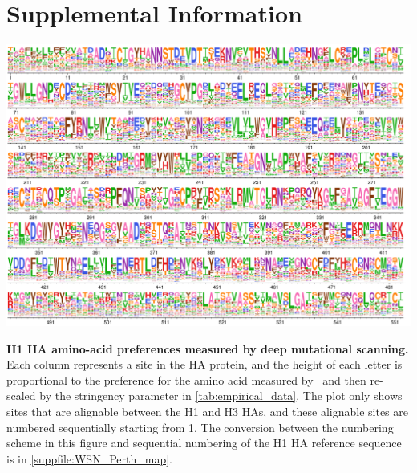\documentclass[11pt]{article}
\begin{document}
\clearpage 

{\small

}

\newpage
\setcounter{page}{1}
\renewcommand{\thepage}{S\arabic{page}}
\section*{Supplemental Information}

\begin{suppfig}[H]
\centerline{\includegraphics[width=\textwidth]{figures/prefs_doud}}
\caption{\label{suppfig:prefs_doud}
\textbf{H1 HA amino-acid preferences measured by deep mutational scanning.}
Each column represents a site in the HA protein, and the height of each letter is proportional to the preference for the amino acid measured by~\citet{doud2016accurate} and then re-scaled by the stringency parameter in \ref{tab:empirical_data}. 
The plot only shows sites that are alignable between the H1 and H3 HAs, and these alignable sites are numbered sequentially starting from 1.
The conversion between the numbering scheme in this figure and sequential numbering of the H1 HA reference sequence is in \ref{suppfile:WSN_Perth_map}. 
}
\end{suppfig}
\clearpage 
\end{document}
